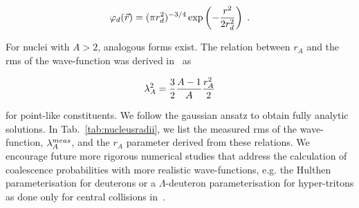 \begin{equation}\label{eq:WaveHeinz}
 \varphi_{d}(\vec{r}) = (\pi r_{d}^2)^{-3/4} \exp\left(-{r^2 \over 2 r_{d}^2}\right) \;.
\end{equation}

\noindent For nuclei with $A > 2$, analogous forms exist. The relation between $r_{A}$ and the rms of the wave-function was derived in~\cite{Shebeko:2006ud} as

\begin{equation}
 \lambda_{A}^2 = {3 \over 2}{A - 1 \over A} {r_{A}^2 \over 2}
\end{equation} 

\noindent for point-like constituents. 
We follow the gaussian ansatz to obtain fully analytic solutions.
In Tab.~\ref{tab:nucleusradii}, we list the measured rms of the wave-function, $\lambda_{A}^{meas}$, and the $r_{A}$ parameter derived from these relations. 
We encourage future more rigorous numerical studies that address the calculation of coalescence probabilities with more realistic wave-functions, e.g. the Hulthen parameterisation for deuterons \cite{Nagle:1996vp} or a $\Lambda$-deuteron parameterisation for hyper-tritons as done only for central collisions in~\cite{Zhang:2018euf}. 

